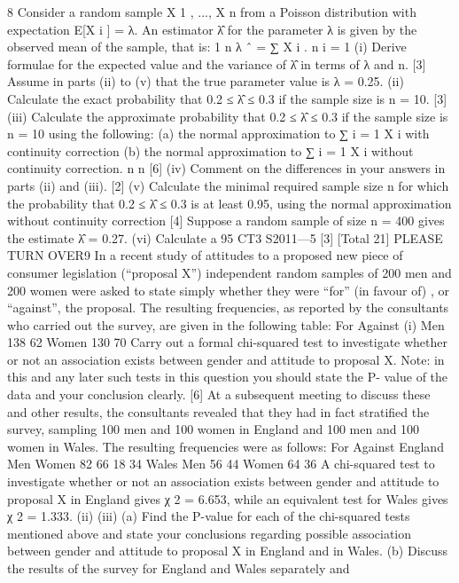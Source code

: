 8
Consider a random sample X 1 , ..., X n from a Poisson distribution with expectation
E[X i ] = λ. An estimator λ̂ for the parameter λ is given by the observed mean of the
sample, that is:
1 n
λ ˆ = ∑ X i .
n i = 1
(i)
Derive formulae for the expected value and the variance of λ̂ in terms of λ
and n.
[3]
Assume in parts (ii) to (v) that the true parameter value is λ = 0.25.
(ii) Calculate the exact probability that 0.2 ≤ λ̂ ≤ 0.3 if the sample size is n = 10.
[3]
(iii) Calculate the approximate probability that 0.2 ≤ λ̂ ≤ 0.3 if the sample size is
n = 10 using the following:
(a) the normal approximation to ∑ i = 1 X i with continuity correction
(b) the normal approximation to ∑ i = 1 X i without continuity correction.
n
n
[6]
(iv) Comment on the differences in your answers in parts (ii) and (iii).
[2]
(v) Calculate the minimal required sample size n for which the probability that
0.2 ≤ λ̂ ≤ 0.3 is at least 0.95, using the normal approximation without
continuity correction
[4]
Suppose a random sample of size n = 400 gives the estimate λ̂ = 0.27.
(vi)
Calculate a 95%
CT3 S2011—5
[3]
[Total 21]
PLEASE TURN OVER9
In a recent study of attitudes to a proposed new piece of consumer legislation
(“proposal X”) independent random samples of 200 men and 200 women were asked
to state simply whether they were “for” (in favour of) , or “against”, the proposal.
The resulting frequencies, as reported by the consultants who carried out the survey,
are given in the following table:
For
Against
(i)
Men
138
62
Women
130
70
Carry out a formal chi-squared test to investigate whether or not an association
exists between gender and attitude to proposal X.
Note: in this and any later such tests in this question you should state the P-
value of the data and your conclusion clearly.
[6]
At a subsequent meeting to discuss these and other results, the consultants revealed
that they had in fact stratified the survey, sampling 100 men and 100 women in
England and 100 men and 100 women in Wales. The resulting frequencies were as
follows:
For
Against
England
Men
Women
82
66
18
34
Wales
Men
56
44
Women
64
36
A chi-squared test to investigate whether or not an association exists between gender
and attitude to proposal X in England gives χ 2 = 6.653, while an equivalent test for
Wales gives χ 2 = 1.333.
(ii)
(iii)
(a) Find the P-value for each of the chi-squared tests mentioned above and
state your conclusions regarding possible association between gender
and attitude to proposal X in England and in Wales.
(b) Discuss the results of the survey for England and Wales separately and
